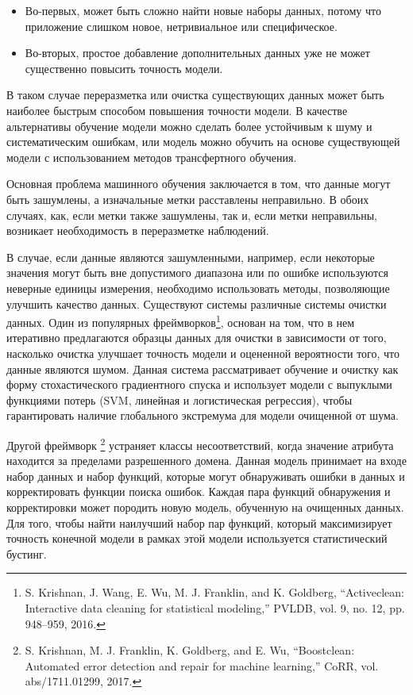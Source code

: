 \documentclass[12pt,a4paper, oneside]{extreport}
\begin{document}
\begin{itemize}
	\item Во-первых, может быть сложно найти новые наборы данных, потому что приложение слишком новое, нетривиальное или специфическое.
	\item  Во-вторых, простое добавление дополнительных данных уже не может существенно повысить точность модели. 
\end{itemize}

В таком случае переразметка   или очистка существующих данных может быть наиболее быстрым способом повышения точности модели. В качестве альтернативы обучение модели можно сделать более устойчивым к шуму и систематическим  ошибкам, или модель можно обучить на основе существующей модели с использованием методов трансфертного обучения. 


Основная проблема машинного обучения заключается в том, что данные могут быть зашумлены, а изначальные метки расставлены  неправильно. 
В обоих  случаях, как,  если метки также зашумлены, так и, если метки неправильны, возникает необходимость в   переразметке наблюдений. 

В случае, если данные являются зашумленными, например, если некоторые значения могут быть вне допустимого диапазона  или по ошибке используются неверные  единицы измерения, необходимо использовать методы, позволяющие улучшить качество данных. 
Существуют системы различные системы очистки данных. Один из популярных фреймворков\footnote{ S. Krishnan, J. Wang, E. Wu, M. J. Franklin, and K. Goldberg, 	“Activeclean: Interactive data cleaning for statistical modeling,” PVLDB, vol. 9, no. 12, pp. 948–959, 2016.}, основан на том, что в нем итеративно предлагаются  образцы данных для очистки в зависимости от того, насколько очистка улучшает точность модели и оцененной вероятности  того, что данные являются шумом. Данная система рассматривает обучение и очистку как форму стохастического градиентного спуска и использует модели с  выпуклыми функциями  потерь (SVM, линейная и логистическая регрессия), чтобы гарантировать  наличие глобального экстремума для модели очищенной от шума. 

Другой фреймворк \footnote{S. Krishnan, M. J. Franklin, K. Goldberg, and E. Wu, “Boostclean: 	Automated error detection and repair for machine learning,” 	CoRR, vol. abs/1711.01299, 2017.} устраняет  классы несоответствий, когда значение атрибута находится за пределами разрешенного домена. Данная модель принимает на входе набор данных и набор функций, которые могут обнаруживать  ошибки  в данных и корректировать функции поиска ошибок. 
Каждая пара функций обнаружения и корректировки может породить  новую модель, обученную на очищенных данных. Для того,  чтобы найти наилучший набор пар функций, который максимизирует точность конечной модели в рамках этой модели используется статистический бустинг. 
\end{document}
